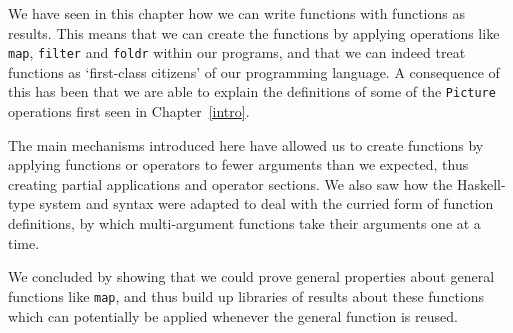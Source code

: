 \begin{summary}
We have seen in this chapter how we can write functions with functions
as results. This means that we can create the functions by
applying operations like \texttt{map}, \texttt{filter} and \texttt{foldr} within
our programs, and that we can indeed treat functions as `first-class
citizens' of our programming language. A consequence of this has been that we
are able to explain the definitions of some of the \texttt{Picture}
operations first seen in Chapter~\ref{intro}.

The main mechanisms  introduced here have allowed us to create functions
by applying functions or operators to fewer arguments than we expected,
thus creating partial applications and operator sections. We also saw
how the Haskell-type system and syntax were adapted to deal with the
curried form of function definitions, by which multi-argument functions
take their arguments one at a time.

We concluded by showing that we could prove general properties about
general functions like \texttt{map}, and thus build up libraries of
results about these functions which can potentially be applied whenever the general
function is reused.

\end{summary}

